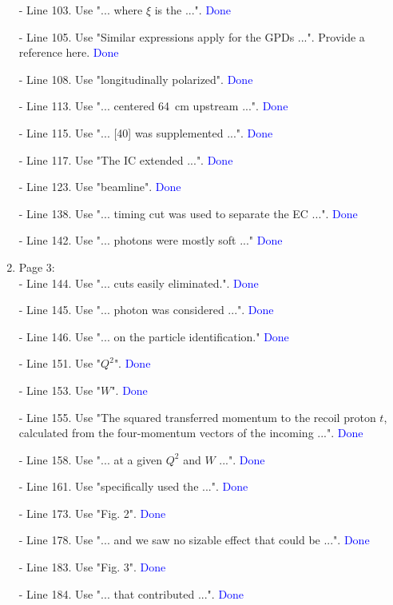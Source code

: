 \documentclass[a4paper,11pt,twoside]{article}
\begin{document}
\begin{enumerate}
 - Line 103. Use "... where $\xi$ is the ...".
    \textcolor{blue}{Done}
 
 - Line 105. Use "Similar expressions apply for the GPDs ...". Provide a 
   reference here.
     \textcolor{blue}{Done}
 
 - Line 108. Use "longitudinally polarized".
      \textcolor{blue}{Done}
 
- Line 113. Use "... centered 64~cm upstream ...".
      \textcolor{blue}{Done}
 
- Line 115. Use "... [40] was supplemented ...".
      \textcolor{blue}{Done}
 
- Line 117. Use "The IC extended ...".
      \textcolor{blue}{Done}
 
- Line 123. Use "beamline".
      \textcolor{blue}{Done}
 
- Line 138. Use "... timing cut was used to separate the EC ...".
      \textcolor{blue}{Done}
 
- Line 142. Use "... photons were mostly soft ..."
     \textcolor{blue}{Done}
~\\
  \item Page 3:\\
 - Line 144. Use "... cuts easily eliminated.".
    \textcolor{blue}{Done}

- Line 145. Use "... photon was considered ...".
     \textcolor{blue}{Done }

- Line 146. Use "... on the particle identification."
     \textcolor{blue}{Done }

- Line 151. Use "$Q^2$".
     \textcolor{blue}{Done}

- Line 153. Use "$W$".
     \textcolor{blue}{Done }

- Line 155. Use "The squared transferred momentum to the recoil proton $t$, 
  calculated from the four-momentum vectors of the incoming ...".
     \textcolor{blue}{Done }

- Line 158. Use "... at a given $Q^2$ and $W$ ...".
     \textcolor{blue}{Done}

- Line 161. Use "specifically used the ...".
     \textcolor{blue}{Done}

- Line 173. Use "Fig. 2".
     \textcolor{blue}{Done}

- Line 178. Use "... and we saw no sizable effect that could be ...".
     \textcolor{blue}{Done}

- Line 183. Use "Fig. 3".
     \textcolor{blue}{Done}

- Line 184. Use "... that contributed ...".
     \textcolor{blue}{Done}


\end{enumerate}
\end{document}
